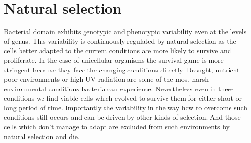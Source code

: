\section{Natural selection}
Bacterial domain exhibits genotypic and phenotypic variability even at the levels of genus.
This variability is continuously regulated by natural selection as the cells better adapted to the current conditions are more likely to survive and proliferate.
In the case of unicellular organisms the survival game is more stringent because they face the changing conditions directly.
Drought, nutrient poor environments or high UV radiation are some of the most harsh environmental conditions bacteria can experience.
Nevertheless even in these conditions we find viable cells which evolved to survive them for either short or long period of time.
Importantly the variability in the way how to overcome such conditions still occurs and can be driven by other kinds of selection.
And those cells which don't manage to adapt are excluded from such environments by natural selection and die.



